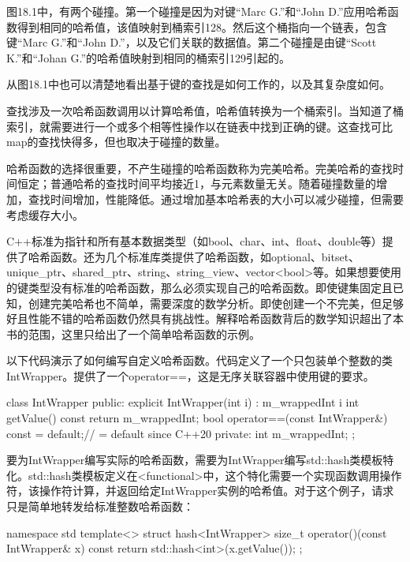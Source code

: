 
图18.1中，有两个碰撞。第一个碰撞是因为对键“Marc G.”和“John D.”应用哈希函数得到相同的哈希值，该值映射到桶索引128。然后这个桶指向一个链表，包含键“Marc G.”和“John D.”，以及它们关联的数据值。第二个碰撞是由键“Scott K.”和“Johan G.”的哈希值映射到相同的桶索引129引起的。

从图18.1中也可以清楚地看出基于键的查找是如何工作的，以及其复杂度如何。

查找涉及一次哈希函数调用以计算哈希值，哈希值转换为一个桶索引。当知道了桶索引，就需要进行一个或多个相等性操作以在链表中找到正确的键。这查找可比map的查找快得多，但也取决于碰撞的数量。

哈希函数的选择很重要，不产生碰撞的哈希函数称为完美哈希。完美哈希的查找时间恒定；普通哈希的查找时间平均接近1，与元素数量无关。随着碰撞数量的增加，查找时间增加，性能降低。通过增加基本哈希表的大小可以减少碰撞，但需要考虑缓存大小。

C++标准为指针和所有基本数据类型（如bool、char、int、float、double等）提供了哈希函数。还为几个标准库类提供了哈希函数，如optional、bitset、unique\_ptr、shared\_ptr、string、string\_view、vector<bool>等。如果想要使用的键类型没有标准的哈希函数，那么必须实现自己的哈希函数。即使键集固定且已知，创建完美哈希也不简单，需要深度的数学分析。即使创建一个不完美，但足够好且性能不错的哈希函数仍然具有挑战性。解释哈希函数背后的数学知识超出了本书的范围，这里只给出了一个简单哈希函数的示例。

以下代码演示了如何编写自定义哈希函数。代码定义了一个只包装单个整数的类IntWrapper。提供了一个operator==，这是无序关联容器中使用键的要求。

\begin{cpp}
class IntWrapper
{
    public:
        explicit IntWrapper(int i) : m_wrappedInt { i } {}
        int getValue() const { return m_wrappedInt; }
        bool operator==(const IntWrapper&) const = default;// = default since C++20
    private:
        int m_wrappedInt;
};
\end{cpp}

要为IntWrapper编写实际的哈希函数，需要为IntWrapper编写std::hash类模板特化。std::hash类模板定义在<functional>中，这个特化需要一个实现函数调用操作符，该操作符计算，并返回给定IntWrapper实例的哈希值。对于这个例子，请求只是简单地转发给标准整数哈希函数：

\begin{cpp}
namespace std
{
    template<> struct hash<IntWrapper>
    {
        size_t operator()(const IntWrapper& x) const {
            return std::hash<int>{}(x.getValue());
        }
    };
}
\end{cpp}

